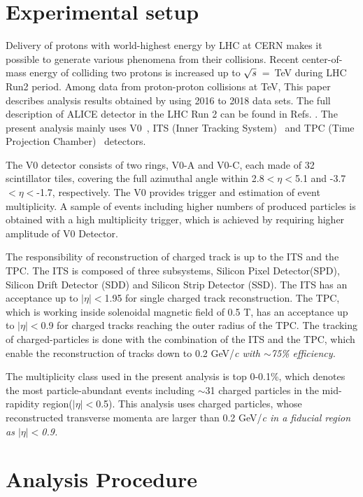 
\section{Experimental setup}
\label{sec:experiment}

Delivery of protons with world-highest energy by LHC at CERN makes it possible to generate various phenomena from their collisions. Recent center-of-mass energy of colliding two protons is increased up to $\sqrt{\it{s}}$~=~\unit[13]{TeV} during LHC Run2 period. Among data from proton-proton collisions at \unit[13]{TeV}, This paper describes analysis results obtained by using 2016 to 2018 data sets. The full description of ALICE detector in the LHC Run 2 can be found in Refs. \cite{Aamodt:2008zz,Abelev:2014ffa}. The present analysis mainly uses V0~\cite{Abbas:2013taa}, ITS (Inner Tracking System)~\cite{aliceITS} and TPC (Time Projection Chamber)~\cite{aliceTPC} detectors.

The V0 detector consists of two rings, V0-A and V0-C, each made of 32 scintillator tiles, covering the full azimuthal angle within 2.8$<\eta<$5.1 and -3.7$<\eta<$-1.7, respectively. The V0 provides trigger and estimation of event multiplicity. A sample of events including higher numbers of produced particles is obtained with a high multiplicity trigger, which is achieved by requiring higher amplitude of V0 Detector. 

The responsibility of reconstruction of charged track is up to the ITS and the TPC. The ITS is composed of three subsystems, Silicon Pixel Detector(SPD), Silicon Drift Detector (SDD) and Silicon Strip Detector (SSD). The ITS has an acceptance up to $|\eta|<$1.95 for single charged track reconstruction. The TPC, which is working inside solenoidal magnetic field of 0.5 T, has an acceptance up to $|\eta|<$0.9 for charged tracks reaching the outer radius of the TPC. The tracking of charged-particles is done with the combination of the ITS and the TPC, which enable the reconstruction of tracks down to 0.2 GeV/\it{c}\rm{} with $\sim$75\% efficiency.

The multiplicity class used in the present analysis is top 0-0.1\%, which denotes the most particle-abundant events including  $\sim$31 charged particles in the mid-rapidity region($|\eta|<$0.5). This analysis uses charged particles, whose reconstructed transverse momenta are larger than 0.2 GeV/\it{c}\rm{} in a fiducial region as $|\eta|<$0.9. 

\section{Analysis Procedure}
\label{sec:an}

